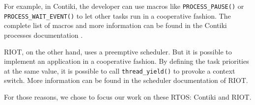 For example, in Contiki, the developer can use macros like \texttt{PROCESS\_PAUSE()} or \texttt{PROCESS\_WAIT\_EVENT()} to let other tasks run in a cooperative fashion.
The complete list of macros and more information can be found in the Contiki processes documentation \cite{contiki-processes}.

RIOT, on the other hand, uses a preemptive scheduler.
But it is possible to implement an application in a cooperative fashion.
By defining the task priorities at the same value, it is possible to call \texttt{thread\_yield()} to provoke a context switch.
More information can be found in the scheduler documentation \cite{riot-scheduler} of RIOT.

For those reasons, we chose to focus our work on these RTOS: Contiki and RIOT.